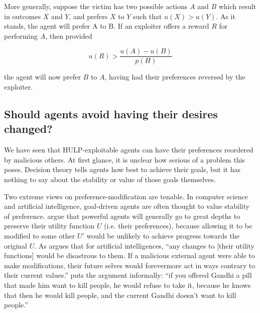 \documentclass{article}
\begin{document}
More generally, suppose the victim has two possible actions \(A\) and \(B\) which result in outcomes \(X\) and \(Y\), and prefers \(X\) to \(Y\) such that \(u(X)>u(Y)\). As it stands, the agent will prefer A to B. If an exploiter offers a reward \(R\) for performing \(A\), then provided

\[u(R) > \frac{u(A)-u(B)}{p(H)}\]

the agent will now prefer \(B\) to \(A\), having had their preferences reversed by the exploiter.

\subsection{Should agents avoid having their desires changed?}

We have seen that HULP-exploitable agents can have their preferences reordered by malicious others. At first glance, it is unclear how serious of a problem this poses. Decision theory tells agents how best to achieve their goals, but it has nothing to say about the stability or value of those goals themselves.

Two extreme views on preference-modification are tenable. In computer science and artificial intelligence, goal-driven agents are often thought to value stability of preference. \citep{omohundro2008basic,bostrom2012will} argue that powerful agents will generally go to great depths to preserve their utility function \(U\) (i.e. their preferences), because allowing it to be modified to some other \(U'\) would be unlikely to achieve progress towards the original \(U\). As \citep{omohundro2008basic} argues that for artificial intelligences, ``any changes to [their utility functions] would be disastrous to them. If a malicious external agent were able to make modifications, their future selves would forevermore act in ways contrary to their current values.'' \citep{1_yudkowsky_2012} puts the argument informally: ``if you offered Gandhi a pill that made him want to kill people, he would refuse to take it, because he knows that then he would kill people, and the current Gandhi doesn't want to kill people.'' 
\end{document}
